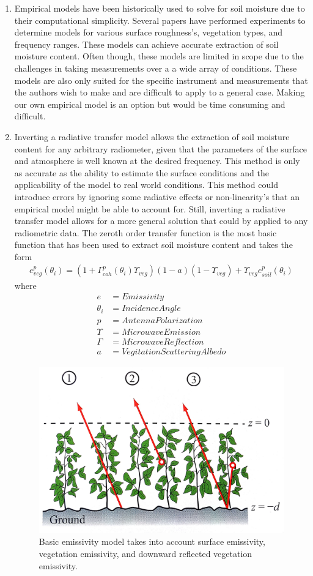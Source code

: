 \documentclass[12pt]{article}
\begin{document}
\begin{enumerate}
\item Empirical models have been historically used to solve for soil moisture due to their computational simplicity. Several papers have performed experiments to determine models for various surface roughness's, vegetation types, and frequency ranges. These models can achieve accurate extraction of soil moisture content. Often though, these models are limited in scope due to the challenges in taking measurements over a a wide array of conditions. These models are also only suited for the specific instrument and measurements that the authors wish to make and are difficult to apply to a general case. Making our own empirical model is an option but would be time consuming and difficult.

\item Inverting a radiative transfer model allows the extraction of soil moisture content for any arbitrary radiometer, given that the parameters of the surface and atmosphere is well known at the desired frequency. This method is only as accurate as the ability to estimate the surface conditions and the applicability of the model to real world conditions. This method could introduce errors by ignoring some radiative effects or non-linearity's that an empirical model might be able to account for. Still, inverting a radiative transfer model allows for a more general solution that could by applied to any radiometric data. The zeroth order transfer function is the most basic function that has been used to extract soil moisture content and takes the form
\begin{align}
e_{veg}^p(\theta_i) = (1+\Gamma_{coh}^p(\theta_i)\Upsilon_{veg})(1-a)(1-\Upsilon_{veg})+\Upsilon_{veg}e_{soil}^p(\theta_i)
\end{align}
where
\begin{align}
e &= Emissivity\\
\theta_i &= Incidence Angle\\
p &= Antenna Polarization\\
\Upsilon &= Microwave Emission\\
\Gamma &= Microwave Reflection\\
a &= Vegitation Scattering Albedo
\end{align}

\begin{figure}[htbp!]
	\centering
	\includegraphics[width=.4\linewidth]{Figures/ZRT.jpg}
	\caption{Basic emissivity model takes into account surface emissivity, vegetation emissivity, and downward reflected vegetation emissivity. \cite{ulaby_fung_moore_1986}}
	\label{fig:zrt}
\end{figure}


\end{enumerate}
\end{document}
